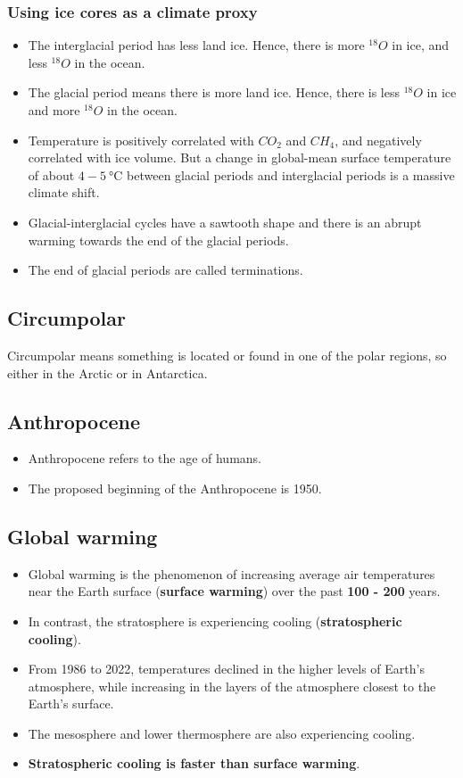 \documentclass[11pt]{article}
\begin{document}
\subsubsection{Using ice cores as a climate proxy}
\label{sec:orgcc84e8e}
\begin{itemize}
\item The interglacial period has less land ice. Hence, there is more \(^{18}O\) in ice, and less \(^{18}O\) in the ocean.
\item The glacial period means there is more land ice. Hence, there is less \(^{18}O\) in ice and more \(^{18}O\) in the ocean.
\item Temperature is positively correlated with \(CO_2\) and \(CH_4\), and negatively correlated with ice volume. But a change in global-mean surface temperature of about \(4 - 5 \ \unit{\degreeCelsius}\) between glacial periods and interglacial periods is a massive climate shift.
\item Glacial-interglacial cycles have a sawtooth shape and there is an abrupt warming towards the end of the glacial periods.
\item The end of glacial periods are called terminations.
\end{itemize}

\subsection{Circumpolar}
\label{sec:orgd522938}
Circumpolar means something is located or found in one of the polar regions, so either in the Arctic or in Antarctica.

\subsection{Anthropocene}
\label{sec:orgd8483de}
\begin{itemize}
\item Anthropocene refers to the age of humans.
\item The proposed beginning of the Anthropocene is 1950.
\end{itemize}

\subsection{Global warming}
\label{sec:org2378a04}
\begin{itemize}
\item Global warming is the phenomenon of increasing average air temperatures near the Earth surface (\textbf{surface warming}) over the past \textbf{100 - 200} years.
\item In contrast, the stratosphere is experiencing cooling (\textbf{stratospheric cooling}).
\item From 1986 to 2022, temperatures declined in the higher levels of Earth's atmosphere, while increasing in the layers of the atmosphere closest to the Earth's surface.
\item The mesosphere and lower thermosphere are also experiencing cooling.
\item \textbf{Stratospheric cooling is faster than surface warming}.
\end{itemize}
\end{document}
